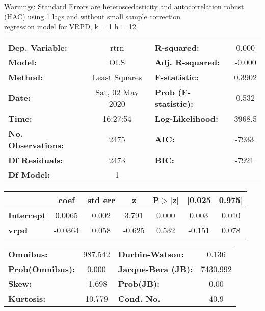 Warnings: \newline
 [1] Standard Errors are heteroscedasticity and autocorrelation robust (HAC) using 1 lags and without small sample correction\\ 

regression model for VRPD, k = 1 h = 12\begin{center}
\begin{tabular}{lclc}
\toprule
\textbf{Dep. Variable:}    &       rtrn       & \textbf{  R-squared:         } &     0.000   \\
\textbf{Model:}            &       OLS        & \textbf{  Adj. R-squared:    } &    -0.000   \\
\textbf{Method:}           &  Least Squares   & \textbf{  F-statistic:       } &    0.3902   \\
\textbf{Date:}             & Sat, 02 May 2020 & \textbf{  Prob (F-statistic):} &    0.532    \\
\textbf{Time:}             &     16:27:54     & \textbf{  Log-Likelihood:    } &    3968.5   \\
\textbf{No. Observations:} &        2475      & \textbf{  AIC:               } &    -7933.   \\
\textbf{Df Residuals:}     &        2473      & \textbf{  BIC:               } &    -7921.   \\
\textbf{Df Model:}         &           1      & \textbf{                     } &             \\
\bottomrule
\end{tabular}
\begin{tabular}{lcccccc}
                   & \textbf{coef} & \textbf{std err} & \textbf{z} & \textbf{P$> |$z$|$} & \textbf{[0.025} & \textbf{0.975]}  \\
\midrule
\textbf{Intercept} &       0.0065  &        0.002     &     3.791  &         0.000        &        0.003    &        0.010     \\
\textbf{vrpd}      &      -0.0364  &        0.058     &    -0.625  &         0.532        &       -0.151    &        0.078     \\
\bottomrule
\end{tabular}
\begin{tabular}{lclc}
\textbf{Omnibus:}       & 987.542 & \textbf{  Durbin-Watson:     } &    0.136  \\
\textbf{Prob(Omnibus):} &   0.000 & \textbf{  Jarque-Bera (JB):  } & 7430.992  \\
\textbf{Skew:}          &  -1.698 & \textbf{  Prob(JB):          } &     0.00  \\
\textbf{Kurtosis:}      &  10.779 & \textbf{  Cond. No.          } &     40.9  \\
\bottomrule
\end{tabular}
\end{center}

